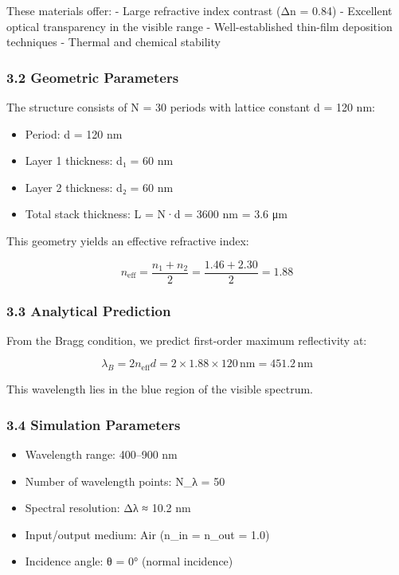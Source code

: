 \documentclass[
]{article}
\providecommand{\tightlist}{%
  \setlength{\itemsep}{0pt}\setlength{\parskip}{0pt}}
\begin{document}
These materials offer: - Large refractive index contrast (Δn = 0.84) -
Excellent optical transparency in the visible range - Well-established
thin-film deposition techniques - Thermal and chemical stability

\subsubsection{3.2 Geometric Parameters}\label{geometric-parameters}

The structure consists of N = 30 periods with lattice constant d = 120
nm:

\begin{itemize}
\tightlist
\item
  Period: d = 120 nm
\item
  Layer 1 thickness: d₁ = 60 nm
\item
  Layer 2 thickness: d₂ = 60 nm
\item
  Total stack thickness: L = N·d = 3600 nm = 3.6 μm
\end{itemize}

This geometry yields an effective refractive index:

\[n_{\text{eff}} = \frac{n_1 + n_2}{2} = \frac{1.46 + 2.30}{2} = 1.88\]

\subsubsection{3.3 Analytical Prediction}\label{analytical-prediction}

From the Bragg condition, we predict first-order maximum reflectivity
at:

\[\lambda_B = 2n_{\text{eff}}d = 2 \times 1.88 \times 120\,\text{nm} = 451.2\,\text{nm}\]

This wavelength lies in the blue region of the visible spectrum.

\subsubsection{3.4 Simulation Parameters}\label{simulation-parameters}

\begin{itemize}
\tightlist
\item
  Wavelength range: 400--900 nm
\item
  Number of wavelength points: N\_λ = 50
\item
  Spectral resolution: Δλ ≈ 10.2 nm
\item
  Input/output medium: Air (n\_in = n\_out = 1.0)
\item
  Incidence angle: θ = 0° (normal incidence)
\end{itemize}
\end{document}
